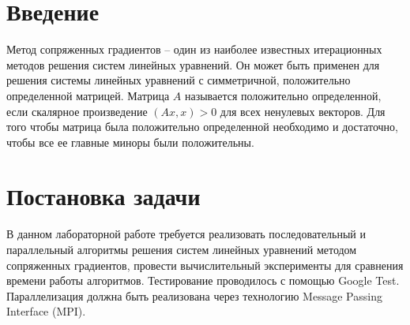 \documentclass{report}
\begin{document}
\setcounter{page}{2}

\tableofcontents
\newpage

\section*{Введение}
\par Метод сопряженных градиентов – один из наиболее известных итерационных методов решения систем линейных уравнений. Он может быть применен для решения системы линейных уравнений с симметричной, положительно определенной матрицей. Матрица $A$ называется положительно определенной, если скалярное произведение $(Ax, x) > 0$ для всех ненулевых векторов. Для того чтобы матрица была положительно определенной необходимо и достаточно, чтобы все ее главные миноры были положительны.
\newpage

\section*{Постановка задачи}
\par В данном лабораторной работе требуется реализовать последовательный и параллельный алгоритмы решения систем линейных уравнений методом сопряженных градиентов, провести вычислительный эксперименты для сравнения времени работы алгоритмов. Тестирование проводилось с помощью Google Test. Параллелизация должна быть реализована через технологию Message Passing Interface (MPI).
\newpage

\end{document}

